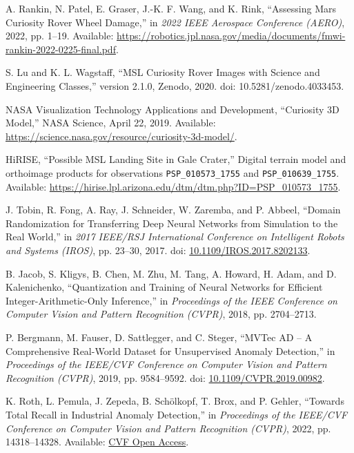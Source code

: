 A. Rankin, N. Patel, E. Graser, J.-K. F. Wang, and K. Rink,
``Assessing Mars Curiosity Rover Wheel Damage,''
in \textit{2022 IEEE Aerospace Conference (AERO)},
2022, pp. 1--19.
Available:
\url{https://robotics.jpl.nasa.gov/media/documents/fmwi-rankin-2022-0225-final.pdf}.

S. Lu and K. L. Wagstaff,
``MSL Curiosity Rover Images with Science and Engineering Classes,''
version 2.1.0, Zenodo, 2020.
doi: 10.5281/zenodo.4033453.

NASA Visualization Technology Applications and Development,
``Curiosity 3D Model,''
NASA Science, April 22, 2019.
Available: \url{https://science.nasa.gov/resource/curiosity-3d-model/}.

HiRISE,
``Possible MSL Landing Site in Gale Crater,''
Digital terrain model and orthoimage products for observations
\texttt{PSP\_010573\_1755} and \texttt{PSP\_010639\_1755}.
Available: \url{https://hirise.lpl.arizona.edu/dtm/dtm.php?ID=PSP_010573_1755}.

J. Tobin, R. Fong, A. Ray, J. Schneider, W. Zaremba, and P. Abbeel,
``Domain Randomization for Transferring Deep Neural Networks
from Simulation to the Real World,''
in \emph{2017 IEEE/RSJ International Conference on Intelligent
    Robots and Systems (IROS)}, pp. 23--30, 2017.
doi: \href{https://doi.org/10.1109/IROS.2017.8202133}
{10.1109/IROS.2017.8202133}.

B. Jacob, S. Kligys, B. Chen, M. Zhu, M. Tang, A. Howard,
H. Adam, and D. Kalenichenko,
``Quantization and Training of Neural Networks for Efficient
Integer-Arithmetic-Only Inference,''
in \textit{Proceedings of the IEEE Conference on Computer Vision
    and Pattern Recognition (CVPR)}, 2018, pp. 2704--2713.

P. Bergmann, M. Fauser, D. Sattlegger, and C. Steger,
``MVTec AD -- A Comprehensive Real-World Dataset for
Unsupervised Anomaly Detection,''
in \textit{Proceedings of the IEEE/CVF Conference on
    Computer Vision and Pattern Recognition (CVPR)},
2019, pp. 9584--9592.
doi: \href{https://doi.org/10.1109/CVPR.2019.00982}
{10.1109/CVPR.2019.00982}.

K. Roth, L. Pemula, J. Zepeda, B. Sch\"olkopf,
T. Brox, and P. Gehler,
``Towards Total Recall in Industrial Anomaly Detection,''
in \textit{Proceedings of the IEEE/CVF Conference on
    Computer Vision and Pattern Recognition (CVPR)},
2022, pp. 14318--14328.
Available:
\href{https://openaccess.thecvf.com/content/CVPR2022/html/Roth_Towards_Total_Recall_in_Industrial_Anomaly_Detection_CVPR_2022_paper.html}
{CVF Open Access}.

